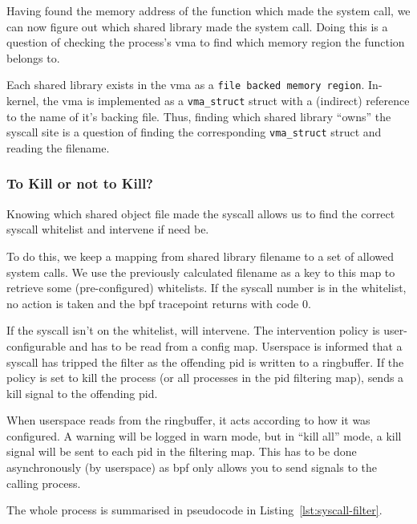 Having found the memory address of the function which made the system call, we
can now figure out which shared library made the system call. Doing this is a
question of checking the process's \ac{vma} to find which memory region the
function belongs to. 

Each shared library exists in the \ac{vma} as a \texttt{file backed memory region}.
In-kernel, the \ac{vma} is implemented as a \texttt{vma\_struct} struct with a
(indirect) reference to the name of it's backing file. Thus, finding which
shared library ``owns'' the syscall site is a question of finding the
corresponding \texttt{vma\_struct} struct and reading the filename.


\subsubsection{To Kill or not to Kill?}

Knowing which shared object file made the syscall allows us to find the correct
syscall whitelist and intervene if need be.

To do this, we keep a mapping from shared library filename to a set of allowed
system calls. We use the previously calculated filename as a key to this map to
retrieve some (pre-configured) whitelists. If the syscall number is in the
whitelist, no action is taken and the \ac{bpf} tracepoint returns with code 0.

If the syscall isn't on the whitelist, \af will intervene. The intervention
policy is user-configurable and has to be read from a config map. Userspace is
informed that a syscall has tripped the filter as the offending \ac{pid} is
written to a ringbuffer. If the policy is set to kill the process (or all 
processes in the \ac{pid} filtering map), \af sends a kill signal to the 
offending \ac{pid}. 

When userspace reads  from the ringbuffer, it acts according to how it was
configured. A warning will be logged in warn mode, but in ``kill all'' mode, a
kill signal will be sent to each \ac{pid} in the filtering map. This has to be
done asynchronously (by userspace) as \ac{bpf} only allows you to send signals
to the calling process.

The whole process is summarised in pseudocode in
Listing~\ref{lst:syscall-filter}.

